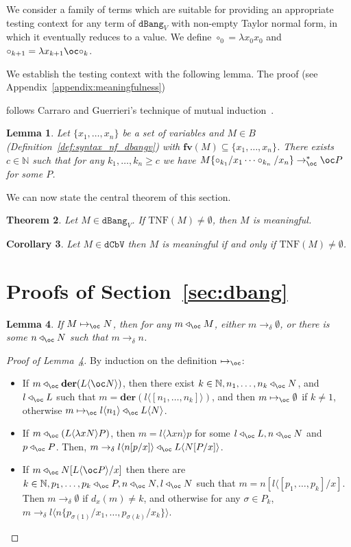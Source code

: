 \documentclass[10pt,a4paper]{article}
\newtheorem{theorem}{Theorem}
\newtheorem{lemma}[theorem]{Lemma}
\newtheorem{corollary}[theorem]{Corollary}
\newif\iflong
\newcommand{\<}{\langle}
\renewcommand{\>}{\rangle}
\newcommand{\der}[1]{\ensuremath{\mathbf{der}(#1)}}
\newcommand{\fv}{\mathbf{fv}}
\newcommand{\dcbv}{\ensuremath{\mathtt{dCbV}}}
\newcommand{\dbang}{\ensuremath{\mathtt{dBang}}}
\newcommand{\dbangv}{\ensuremath{\dbang_V}}
\newcommand{\todb}{\mapsto_{\oc}} %
\newcommand{\todbf}{\to_{\oc}} %
\newcommand{\todbr}{\to_{\delta}} %
\newcommand{\app}{\triangleleft_\oc} %
\newcommand{\taylornf}[1]{\ensuremath{\text{TNF}(#1)}}
\newif\iflong\longtrue
\begin{document}
We consider a family of terms which are
suitable for providing an appropriate testing context for any term of $\dbangv$
with non-empty Taylor normal form, in which it eventually reduces to a value. We define
$\circ_0=\lambda x_0x_0$ and $\circ_{k+1}=\lambda x_{k+1}\oc\circ_k$.

We establish the testing context with the following lemma. The proof 
\iflong (see Appendix~\ref{appendix:meaningfulness}) 
\else (\cite{chardonnet2026approximationtheorydistantbang})
\fi
follows Carraro and Guerrieri's
technique of mutual induction~\cite[Lemmas 26 and 27]{CG14}.

\begin{lemma}\label{lem:mutual1}
	Let $\{x_1,\dots ,x_n\}$ be a set of variables and $M\in B$ 
	(Definition~\ref{def:syntax_nf_dbangv})
	with
	$\fv(M)\subseteq\{x_1,\dots ,x_n\}$. There exists $c\in\mathbb N$ such
	that for any $k_1,\dots ,k_n\geq c$ we have
	$M\{\circ_{k_1}/x_1\dots \circ_{k_n}/x_n\}\todbf^* \oc P$ for some $P$.
\end{lemma}
We can now state the central theorem of this section. 
\begin{theorem}
	\label{thm:dbangv_tnf}
	Let $M\in\dbangv$. If $\taylornf M\neq \emptyset$, then $M$ is
	meaningful.
\end{theorem}


\begin{corollary}
	\label{cor:dcbv-meaningful-iff-taylor}
	Let $M\in\dcbv$ then $M$ is meaningful if and only if $\taylornf
	M\neq\emptyset$.
\end{corollary}

\appendix
\section{Proofs of Section~\ref{sec:dbang}}
\label{appendix:dbang}

\begin{lemma}\label{lem:simu_dbr_one}
	If $M\todb N$, then for any $m\app M$, either $m\todbr \emptyset$, or there is some $n\app N$ such
	that $m\todbr n$.
\end{lemma}

\begin{proof}[Proof of Lemma~\ref{lem:simu_dbr_one}]
	By induction on the definition $\todb$:
	\begin{itemize}
		\item If $m\app\der{L\<\oc N\>}$, then there exist $k\in\mathbb
			N, n_1,\dots ,n_k\app N$, and $l\app L$ such that
			$m=\der{l\<[n_1,\dots ,n_k]\>}$, and then $m\todb \emptyset$ if $k\neq
			1$, otherwise $m\todb l\<n_1\>\app L\<N\>$.
		\item If $m\app(L\<\lambda xN\>P)$, then $m=l\<\lambda xn\>p$
			for some $l\app L, n\app N$ and $p\app P$. Then,
			$m\todbr l\<n[p/x]\>\app L\<N[P/x]\>$.
		\item If $m\app N[L\<\oc P\>/x]$ then there are $k\in\mathbb N,
			p_1,\dots ,p_k\app P, n\app N,l\app N$ such that
			$m=n[l\<[p_1,\dots ,p_k]/x]$. Then $m\todbr \emptyset$ if $d_x(m)\neq
			k$, and otherwise for any $\sigma\in P_k$, $m\todbr
			l\<n\{p_{\sigma(1)}/x_1,\dots ,p_{\sigma(k)}/x_k\}\>$. \qedhere
	\end{itemize}
\end{proof}
\end{document}
